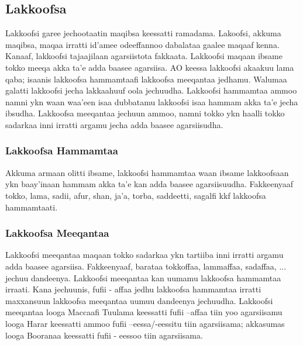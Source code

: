 \documentclass[11pt,b5paper]{book}
\begin{document}
\subsection{Lakkoofsa}

Lakkoofsi garee jechootaatin maqibsa keessatti ramadama. Lakoofsi, akkuma maqibsa, maqaa irratti id'amee odeeffannoo
dabalataa gaalee maqaaf kenna. Kanaaf, lakkoofsi tajaajilaan agarsiistota fakkaata. Lakkoofsi maqaan ibsame tokko meeqa akka ta'e adda baasee agarsiisa. AO keessa lakkoofsi akaakuu lama qaba; isaanis lakkoofsa hammamtaafi lakkoofsa meeqantaa jedhamu. Walumaa galatti lakkoofsi jecha lakkaahuuf oola jechuudha. Lakkoofsi hammamtaa ammoo
namni ykn waan waa'een isaa dubbatamu lakkoofsi isaa hammam akka ta'e jecha ibsudha. Lakkoofsa meeqantaa jechuun ammoo, namni tokko ykn haalli tokko sadarkaa inni irratti argamu jecha adda baasee agarsiisudha. 

\subsubsection{Lakkoofsa Hammamtaa}

Akkuma armaan olitti ibsame, lakkoofsi hammamtaa waan ibsame lakkoofsaan ykn baay'inaan hammam akka ta'e kan
adda baasee agarsiisuudha. Fakkeenyaaf tokko, lama, sadii, afur, shan, ja'a, torba, saddeetti, sagalfi kkf lakkoofsa hammamtaati.

\subsubsection{Lakkoofsa Meeqantaa}
Lakkoofsi meeqantaa maqaan tokko sadarkaa ykn tartiiba inni irratti argamu adda baasee agarsiisa. Fakkeenyaaf, barataa tokkoffaa, lammaffaa, sadaffaa, ... jechuu dandeenya. Lakkoofsi meeqantaa kan uumamu lakkoofsa hammamtaa
irraati. Kana jechuunis, fufii - affaa jedhu lakkoofsa hammamtaa irratti maxxansuun lakkoofsa meeqantaa uumuu
dandeenya jechuudha. Lakkoofsi meeqantaa looga Maccaafi Tuulama keessatti fufii –affaa tiin yoo agarsiisamu looga Harar keessatti ammoo fufii –eessa/-eessitu tiin agarsiisama; akkasumas looga Booranaa keessatti fufii -
eessoo tiin agarsiisama\cite{owens1985grammar,griefenow2001grammatical}. 
\end{document}
